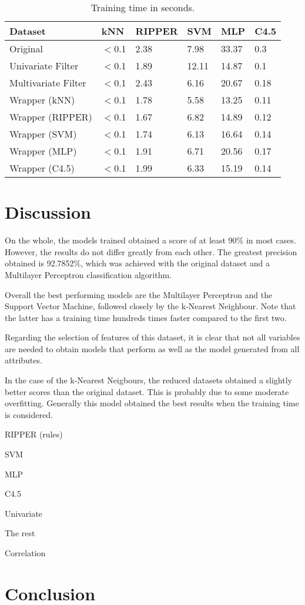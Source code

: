 \documentclass[a4paper,11pt]{article}
\begin{document}
\begin{table}[h]
\centering
\begin{tabular}{||l|l|l|l|l|l||}
	\hline
	Dataset & kNN & RIPPER & SVM & MLP & C4.5\\
	\hline
	Original & $<$0.1 & 2.38 & 7.98 & 33.37 & 0.3\\
	Univariate Filter & $<$0.1 & 1.89 & 12.11 & 14.87 & 0.1\\
	Multivariate Filter & $<$0.1 & 2.43 & 6.16 & 20.67 & 0.18\\
	Wrapper (kNN) & $<$0.1 & 1.78 & 5.58 & 13.25 & 0.11\\
	Wrapper (RIPPER) & $<$0.1 & 1.67 & 6.82 & 14.89 & 0.12\\
	Wrapper (SVM) & $<$0.1 & 1.74 & 6.13 & 16.64 & 0.14\\
	Wrapper (MLP) & $<$0.1 & 1.91 & 6.71 & 20.56 & 0.17\\
	Wrapper (C4.5) & $<$0.1 & 1.99 & 6.33 & 15.19 & 0.14\\
    \hline 
\end{tabular}
\caption{Training time in seconds.}
\label{tab:table7}
\end{table}

\section{Discussion}
\label{sec:discussion}

On the whole, the models trained obtained a score of at least 90\% in most cases. However, the results do not differ greatly from each other. The greatest precision obtained is 92.7852\%, which was achieved with the original dataset and a Multilayer Perceptron classification algorithm.

Overall the best performing models are the Multilayer Perceptron and the Support Vector Machine, followed closely by the k-Nearest Neighbour. Note that the latter has a training time hundreds times faster compared to the first two.

Regarding the selection of features of this dataset, it is clear that not all variables are needed to obtain models that perform as well as the model generated from all attributes.

In the case of the k-Nearest Neigbours, the reduced datasets obtained a slightly better scores than the original dataset. This is probably due to some moderate overfitting. Generally this model obtained the best results when the training time is considered.

RIPPER (rules)

SVM

MLP

C4.5

Univariate

The rest

Correlation

\section{Conclusion}
\label{sec:conclusion}
\end{document}
